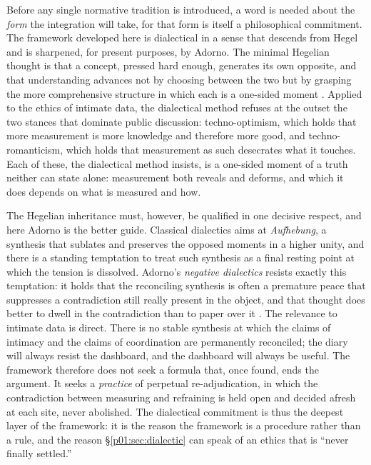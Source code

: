 Before any single normative tradition is introduced, a word is needed about the \emph{form} the integration will take, for that form is itself a philosophical commitment. The framework developed here is dialectical in a sense that descends from Hegel and is sharpened, for present purposes, by Adorno. The minimal Hegelian thought is that a concept, pressed hard enough, generates its own opposite, and that understanding advances not by choosing between the two but by grasping the more comprehensive structure in which each is a one-sided moment \parencite{hegel1807phenomenology}. Applied to the ethics of intimate data, the dialectical method refuses at the outset the two stances that dominate public discussion: techno-optimism, which holds that more measurement is more knowledge and therefore more good, and techno-romanticism, which holds that measurement as such desecrates what it touches. Each of these, the dialectical method insists, is a one-sided moment of a truth neither can state alone: measurement both reveals and deforms, and which it does depends on what is measured and how.

The Hegelian inheritance must, however, be qualified in one decisive respect, and here Adorno is the better guide. Classical dialectics aims at \emph{Aufhebung}, a synthesis that sublates and preserves the opposed moments in a higher unity, and there is a standing temptation to treat such synthesis as a final resting point at which the tension is dissolved. Adorno's \emph{negative dialectics} resists exactly this temptation: it holds that the reconciling synthesis is often a premature peace that suppresses a contradiction still really present in the object, and that thought does better to dwell in the contradiction than to paper over it \parencite{adorno1966negative}. The relevance to intimate data is direct. There is no stable synthesis at which the claims of intimacy and the claims of coordination are permanently reconciled; the diary will always resist the dashboard, and the dashboard will always be useful. The framework therefore does not seek a formula that, once found, ends the argument. It seeks a \emph{practice} of perpetual re-adjudication, in which the contradiction between measuring and refraining is held open and decided afresh at each site, never abolished. The dialectical commitment is thus the deepest layer of the framework: it is the reason the framework is a procedure rather than a rule, and the reason §\ref{p01:sec:dialectic} can speak of an ethics that is ``never finally settled.''

